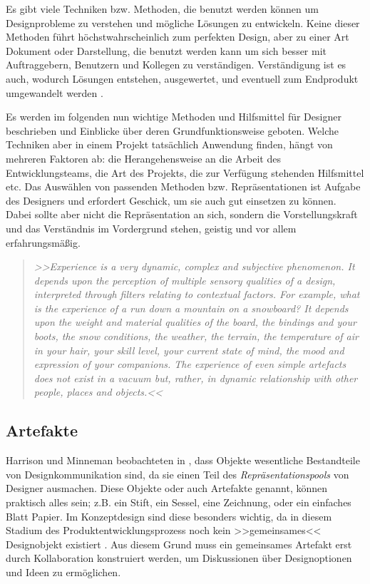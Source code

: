 \medskip Es gibt viele Techniken bzw. Methoden, die benutzt werden können um Designprobleme zu verstehen und mögliche Lösungen zu entwickeln. Keine dieser Methoden führt höchstwahrscheinlich zum perfekten Design, aber zu einer Art Dokument oder Darstellung, die benutzt werden kann um sich besser mit Auftraggebern, Benutzern und Kollegen zu verständigen. Verständigung ist es auch, wodurch Lösungen entstehen, ausgewertet, und eventuell zum Endprodukt umgewandelt werden \citep{Benyon:2005}.

\medskip Es werden im folgenden nun wichtige Methoden und Hilfsmittel für Designer beschrieben und Einblicke über deren Grundfunktionsweise geboten. Welche Techniken aber in einem Projekt tatsächlich Anwendung finden, hängt von mehreren Faktoren ab: die Herangehensweise an die Arbeit des Entwicklungsteams, die Art des Projekts, die zur Verfügung stehenden Hilfsmittel etc. Das Auswählen von passenden Methoden bzw. Repräsentationen ist Aufgabe des Designers und erfordert Geschick, um sie auch gut einsetzen zu können. Dabei sollte aber nicht die Repräsentation an sich, sondern die Vorstellungskraft und das Verständnis im Vordergrund stehen, geistig und vor allem erfahrungsmäßig. \citep{Sagmeister:2008} 

\begin{quote}
	\textsl{>>Experience is a very dynamic, complex and subjective phenomenon. It depends upon the perception of multiple sensory qualities of a design, interpreted through filters relating to contextual factors. For example, what is the experience of a run down a mountain on a snowboard? It depends upon the weight and material qualities of the board, the bindings and your boots, the snow conditions, the weather, the terrain, the temperature of air in your hair, your skill level, your current state of mind, the mood and expression of your companions. The experience of even simple artefacts does not exist in a vacuum but, rather, in dynamic relationship with other people, places and objects.<<}
\begin{flushright}\citep{Buxton:2007}\end{flushright}
\end{quote}

\subsection{Artefakte}
Harrison und Minneman beobachteten in \citep{Harrison:1996}, dass Objekte wesentliche Bestandteile von Designkommunikation sind, da sie einen Teil des \emph{Repräsentationspools} von Designer ausmachen. Diese Objekte oder auch Artefakte genannt, können praktisch alles sein; z.B. ein Stift, ein Sessel, eine Zeichnung, oder ein einfaches Blatt Papier. Im Konzeptdesign sind diese besonders wichtig, da in diesem Stadium des Produktentwicklungsprozess noch kein >>gemeinsames<< Designobjekt existiert \citep{Tuikka:2001}. Aus diesem Grund muss ein gemeinsames Artefakt erst durch Kollaboration konstruiert werden, um Diskussionen über Designoptionen und Ideen zu ermöglichen. \citep{Larsson:2003}


